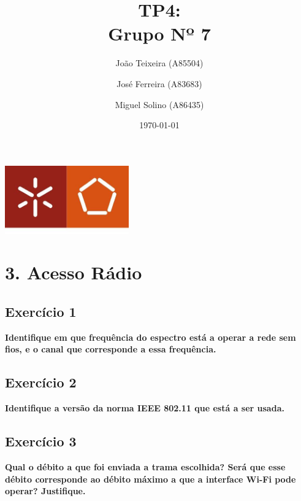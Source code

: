 \documentclass[a4paper]{report}
\begin{document}
\title{TP4:\\ 
\large Grupo Nº 7}
\author{João Teixeira (A85504) \and José Ferreira (A83683) \and Miguel Solino (A86435)}

\date{\today}

\begin{center}
    \begin{minipage}{0.75\linewidth}
        \centering
        \includegraphics[width=0.4\textwidth]{images/eng.jpeg}\par\vspace{1cm}
        \vspace{1cm}
        \href{https://www.uminho.pt/PT}
        {\color{black}{\scshape\LARGE Universidade do Minho}} \par
        \vspace{1cm}
        \href{https://www.di.uminho.pt/}
        {\color{black}{\scshape\Large Departamento de Informática}} \par
        \maketitle
    \end{minipage}
\end{center}

\tableofcontents

\chapter{3. Acesso Rádio}
\section{Exercício 1}
\textbf{Identifique em que frequência do espectro está a operar a rede sem fios,
e o canal que corresponde a essa frequência.}

\section{Exercício 2}
\textbf{Identifique a versão da norma IEEE 802.11 que está a ser usada.}

\section{Exercício 3}
\textbf{Qual o débito a que foi enviada a trama escolhida? Será que esse débito
    corresponde ao débito máximo a que a interface Wi-Fi pode operar?
    Justifique.}
\end{document}
